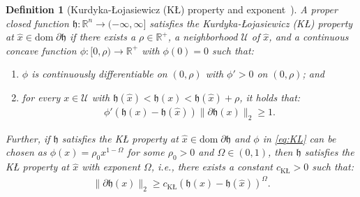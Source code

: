 \documentclass[12pt]{article}
\newtheorem{definition}{Definition}[section]
\numberwithin{equation}{section}
\begin{document}
\begin{definition}[Kurdyka-\L{}ojasiewicz (K\L) property and exponent~\citep{bolte2014proximal}]\label{def:KL-property} A proper closed function $\mathfrak{h}:\mathbb{R}^{n} \to (-\infty, \infty]$ satisfies the Kurdyka-\L{}ojasiewicz (K\L) property at $\hat{x} \in \mathrm{dom}\;\partial \mathfrak{h}$ if there exists a $\rho \in \mathbb{R}^{+}$, a neighborhood $\mathcal{U}$ of $\hat{x}$, and a continuous concave function $\phi: [0, \rho) \to \mathbb{R}^{+}$ with $\phi(0) = 0$ such that:
\begin{enumerate}
    \item [i.] $\phi$ is continuously differentiable on $(0, \rho)$ with $\phi' > 0$ on $(0, \rho)$; and

    \item [ii.] for every $x\in \mathcal{U}$ with $\mathfrak{h}(\hat{x}) < \mathfrak{h}(x) < \mathfrak{h}(\hat{x}) + \rho$, it holds that:
    \begin{align}\label{eq:KL}
        \phi'(\mathfrak{h}(x) - \mathfrak{h}(\hat{x}))\lVert \partial \mathfrak{h}(x)\rVert_2 \geq 1.
    \end{align}
\end{enumerate}
Further, if $\mathfrak{h}$ satisfies the K\L{} property at $\hat{x}\in \mathrm{dom}\;\partial \mathfrak{h}$ and $\phi$ in \eqref{eq:KL} can be chosen as $\phi(x) = \rho_0 x^{1-\Omega}$ for some $\rho_0>0$ and $\Omega\in (0, 1)$, then $\mathfrak{h}$ satisfies the K\L{} property at $\hat{x}$ with exponent $\Omega$, i.e., there exists a constant $c_{\mathrm{K\text{\L}}} > 0$ such that:
\begin{align}\label{eq:KL-1}
    \lVert \partial \mathfrak{h}({x})\lVert_{2} \geq c_{\mathrm{K\text{\L}}}\left(\mathfrak{h}(x) - \mathfrak{h}(\hat{x})\right)^{\Omega}.
\end{align}
\end{definition}
\end{document}
